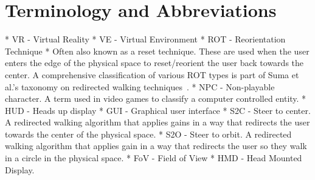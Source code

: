 \chapter{Terminology and Abbreviations}\label{app:terminology}
* VR - Virtual Reality
* VE - Virtual Environment
* ROT - Reorientation Technique
   * Often also known as a reset technique. These are used when the user enters the edge of the physical space to reset/reorient the user back towards the center. A comprehensive classification of various ROT types is part of Suma et al.'s taxonomy on redirected walking techniques~\cite{suma2012taxonomy}. 
* NPC - Non-playable character. A term used in video games to classify a computer controlled entity. 
* HUD - Heads up display
* GUI - Graphical user interface
* S2C - Steer to center. A redirected walking algorithm that applies gains in a way that redirects the user towards the center of the physical space. 
* S2O - Steer to orbit. A redirected walking algorithm that applies gain in a way that redirects the user so they walk in a circle in the physical space. 
* FoV - Field of View
* HMD - Head Mounted Display. 